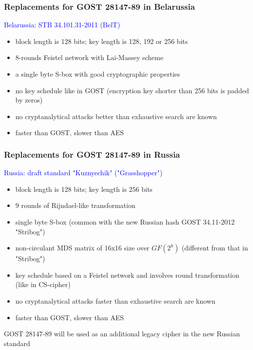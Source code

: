 \documentclass[12pt,mathserif]{beamer}
\begin{document}
 
	\begin{frame}
		\frametitle {Replacements for GOST 28147-89 in Belarussia}
			\textcolor{blue}{Belarussia: STB 34.101.31-2011 (BelT)}
			\begin{itemize}
				\item block length is 128 bits; key length is 128, 192 or 256 bits
				\item 8-rounds Feistel network with Lai-Massey scheme
				\item a single byte S-box with good cryptographic properties
				\item no key schedule like in GOST (encryption key shorter than 256 bits is padded by zeros)
				\item no cryptanalytical attacks better than exhaustive search are known
				\item faster than GOST, slower than AES
			\end{itemize}
		
	\end{frame}
 
	\begin{frame}
		\frametitle {Replacements for GOST 28147-89 in Russia}
			\textcolor{blue}{Russia: draft standard "Kuznyechik" ("Grasshopper")}
			\begin{itemize}%
				\item block length is 128 bits; key length is 256 bits
				\item 9 rounds of Rijndael-like transformation
				\item single byte S-box (common with the new Russian hash GOST 34.11-2012 "Stribog")
				\item non-circulant MDS matrix of 16x16 size over $GF(2^8)$ (different from that in "Stribog")
				\item key schedule based on a Feistel network and involves round transformation (like in CS-cipher)
				\item no cryptanalytical attacks faster than exhaustive search are known
				\item faster than GOST, slower than AES
			\end{itemize}
		\begin{tiny}
			GOST 28147-89 will be used as an additional legacy cipher in the new Russian standard
		\end{tiny}
		
	\end{frame}
\end{document}
